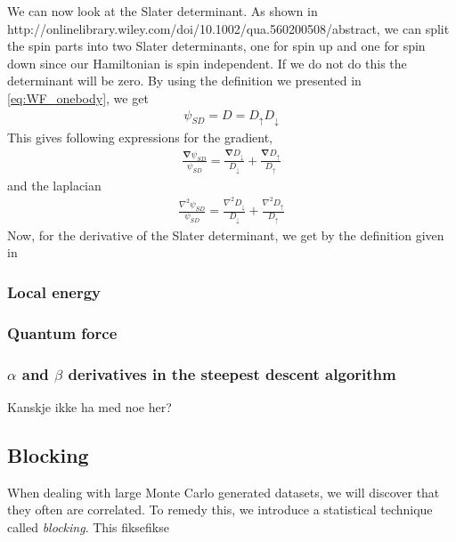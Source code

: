 \documentclass[11pt]{article}
\newcommand{\husk}[1]{\color{red} #1 \color{black}}
\begin{document}
We can now look at the Slater determinant. As shown in http://onlinelibrary.wiley.com/doi/10.1002/qua.560200508/abstract, we can split the spin parts into two Slater determinants, one for spin up and one for spin down since our Hamiltonian is spin independent. If we do not do this the determinant will be zero. By using the definition we presented in \eqref{eq:WF_onebody}, we get
\begin{align}
	\psi_{SD} = D = D_{\uparrow}D_{\downarrow}
	\label{eq:slater-det-spin-up-down}
\end{align}
This gives following expressions for the gradient,
\begin{align}
	\frac{\bm{\nabla}\psi_{SD}}{\psi_{SD}} = \frac{\bm{\nabla}D_{\downarrow}}{D_{\downarrow}} + \frac{\bm{\nabla}D_{\uparrow}}{D_{\uparrow}}
	\label{eq:slater-spin-down-up-grad}
\end{align}
and the laplacian
\begin{align}
	\frac{{\nabla}^2\psi_{SD}}{\psi_{SD}} = \frac{{\nabla}^2D_{\downarrow}}{D_{\downarrow}} + \frac{{\nabla}^2D_{\uparrow}}{D_{\uparrow}}
	\label{eq:slater-spin-down-up-lap}
\end{align}
Now, for the derivative of the Slater determinant, we get by the definition given in 



\subsubsection{Local energy}

\subsubsection{Quantum force}

\subsubsection{\texorpdfstring{$\alpha$}{a} and \texorpdfstring{$\beta$}{b} derivatives in the steepest descent algorithm}
\husk{Kanskje ikke ha med noe her?}


\subsection{Blocking}
When dealing with large Monte Carlo generated datasets, we will discover that they often are correlated. To remedy this, we introduce a statistical technique called \textit{blocking}. This \husk{fiksefikse}
\end{document}
